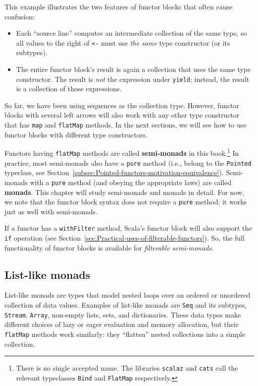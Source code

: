 \vspace{0.2\baselineskip}
This example illustrates the two features of functor blocks that often
cause confusion:
\begin{itemize}
\item Each \textsf{``}source line\textsf{''} computes an intermediate collection of the
same type, so all values to the right of \lstinline!<-! must use
\emph{the same} type constructor (or its subtypes).
\item The entire functor block\textsf{'}s result is again a collection that uses
the same type constructor. The result is \emph{not} the expression
under \lstinline!yield!; instead, the result is a collection of those
expressions.
\end{itemize}
So far, we have been using sequences as the collection type. However,
functor blocks with several left arrows will also work with any other
type constructor that has \lstinline!map! and \lstinline!flatMap!
methods. In the next sections, we will see how to use functor blocks
with different type constructors.

Functors having \lstinline!flatMap! methods are called \textbf{semi-monads}
in this book.\footnote{There is no single accepted name. The libraries \texttt{scalaz} and
\texttt{cats} call the relevant typeclasses \lstinline!Bind! and
\lstinline!FlatMap! respectively.} In practice, most semi-monads also have a \lstinline!pure! method
(i.e., belong to the \lstinline!Pointed! typeclass, see Section~\ref{subsec:Pointed-functors-motivation-equivalence}).
Semi-monads with a \lstinline!pure! method (and obeying the appropriate
laws) are called \textbf{monads}. This chapter will
study semi-monads and monads in detail. For now, we note that the
functor block syntax does not require a \lstinline!pure! method;
it works just as well with semi-monads.

If a functor has a \lstinline!withFilter! method, Scala\textsf{'}s functor
block will also support the \lstinline!if! operation (see Section~\ref{sec:Practical-uses-of-filterable-functors}).
So, the full functionality of functor blocks is available for \emph{filterable
semi-monads}.

\subsection{List-like monads}

List-like monads are types that model nested loops over an ordered
or unordered collection of data values. Examples of list-like monads
are \lstinline!Seq! and its subtypes, \lstinline!Stream!, \lstinline!Array!,
non-empty lists, sets, and dictionaries. These data types make different
choices of lazy or eager evaluation and memory allocation, but their
\lstinline!flatMap! methods work similarly: they \textsf{``}flatten\textsf{''} nested
collections into a simple collection. 

